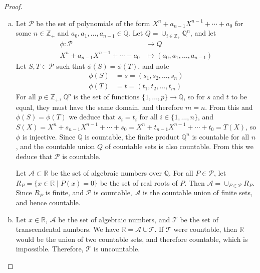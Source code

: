\documentclass[11pt,a4paper,twoside]{article}
\theoremstyle{definition}
\begin{document}
\begin{proof}\hfill

  \begin{enumerate}[(a)]

  \item Let $\mathscr{P}$ be the set of polynomials of the form $X^n + a_{n - 1} X^{n - 1} + \dotsb + a_0$ for some $n \in \mathbb{Z}_+$
    and $a_0, a_1, \dotsc, a_{n - 1} \in \mathbb{Q}$. Let $Q = \cup_{i \in \mathbb{Z}_+} \mathbb{Q}^n$, and let
    \begin{align*}
      \phi : \mathscr{P} &\to Q \\
      X^n + a_{n - 1} X^{n - 1} + \dotsb + a_0 &\mapsto (a_0, a_1, \dotsc, a_{n - 1})
    \end{align*}
    Let $S, T \in \mathscr{P}$ such that $\phi (S) = \phi (T)$, and note
    \begin{align*}
        \phi (S) &= s = (s_1, s_2, \dotsc, s_n) \\
        \phi (T) &= t = (t_1, t_2, \dotsc, t_m)
    \end{align*}
    For all $p \in \mathbb{Z}_+$, $\mathbb{Q}^p$ is the set of functions $\{ 1, \dotsc, p \} \to \mathbb{Q}$, so for $s$ and $t$ to be equal,
    they must have the same domain, and therefore $m = n$. From this and $\phi (S) = \phi (T)$ we deduce that $s_i = t_i$ for all $i \in \{ 1, \dotsc, n \}$,
    and $S (X) = X^n + s_{n - 1} X^{n - 1} + \dotsb + s_0 = X^n + t_{n - 1} X^{n - 1} + \dotsb + t_0 = T (X)$, so $\phi$ is injective.
    Since $\mathbb{Q}$ is countable, the finite product $\mathbb{Q}^n$ is countable for all $n$, and the countable union $Q$ of countable sets is also countable.
    From this we deduce that $\mathscr{P}$ is countable.

    Let $\mathscr{A} \subset \mathbb{R}$ be the set of algebraic numbers over $\mathbb{Q}$. For all $P \in \mathscr{P}$,
    let $R_P = \{ x \in \mathbb{R} \mid P (x) = 0 \}$ be the set of real roots of $P$. Then $\mathscr{A} = \cup_{P \in \mathscr{P}} R_P$.
    Since $R_P$ is finite, and $\mathscr{P}$ is countable, $\mathscr{A}$ is the countable union of finite sets, and hence countable.

  \item Let $x \in \mathbb{R}$, $\mathscr{A}$ be the set of algebraic numbers, and $\mathscr{T}$ be the set of transcendental numbers.
    We have $\mathbb{R} = \mathscr{A} \cup \mathscr{T}$. If $\mathscr{T}$ were countable, then $\mathbb{R}$ would be the union of two countable sets,
    and therefore countable, which is impossible. Therefore, $\mathscr{T}$ is uncountable.

  \end{enumerate}

\end{proof}
\end{document}
